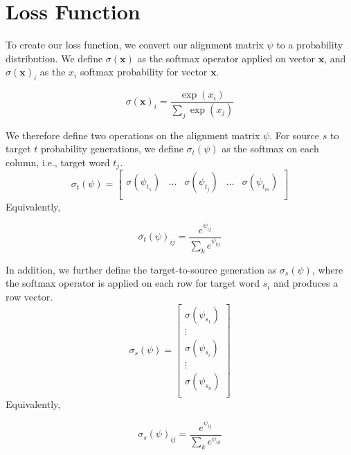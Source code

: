 \documentclass[twoside,twocolumn]{article}
\renewcommand{\vec}[1]{\mathbf{#1}}
\newlength\mystoreparindent
\newenvironment{myparindent}[1]{%
  \setlength{\mystoreparindent}{\the\parindent}
  \setlength{\parindent}{#1}
  }{%
  \setlength{\parindent}{\mystoreparindent}
}
\begin{document}
\clearpage
\appendix
\onecolumn
\begin{myparindent}{0pt}
\section{Loss Function}
\label{appendix:loss-function}
To create our loss function, we convert our alignment matrix $\psi$
to a probability distribution. We define $\sigma(\vec{x})$ as
the softmax operator applied on vector $\vec{x}$, and $\sigma(\vec{x})_i$ as
the $x_i$ softmax probability for vector $\vec{x}$.

\begin{equation}
\sigma(\vec{x})_i = \frac{\exp(x_i)}{\sum_j\exp(x_j)}
\end{equation}

We therefore define two operations on the alignment matrix $\psi$. For source
$s$ to target $t$ probability generations, we define $\sigma_t(\psi)$ as the
softmax on each column, i.e., target word $t_j$.
\begin{equation}
  \sigma_t(\psi) = \left[
    \begin{matrix}
      \sigma(\psi_{t_1}) &
      \hdots &
      \sigma(\psi_{t_j}) &
      \hdots &
      \sigma(\psi_{t_m})  \\
    \end{matrix}
\right]
\end{equation}
Equivalently,

\begin{equation}
  \sigma_t(\psi)_{ij} = \frac{e^{\psi_{ij}}}{\sum_{k} e^{\psi_{kj}}}
\end{equation}

In addition, we further define the target-to-source generation as
$\sigma_s(\psi)$, where the softmax operator is applied on each row for target
word $s_i$ and produces a row vector.
\begin{equation}
  \sigma_s(\psi) = \left[
    \begin{matrix}
      \sigma(\psi_{s_1})  \\
      \vdots \\
      \sigma(\psi_{s_i})  \\
      \vdots \\
      \sigma(\psi_{s_n})  \\
    \end{matrix}
\right]
\end{equation}
Equivalently,

\begin{equation}
  \sigma_s(\psi)_{ij} = \frac{e^{\psi_{ij}}}{\sum_{k} e^{\psi_{ik}}}
\end{equation}


\end{myparindent}
\end{document}
